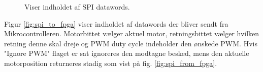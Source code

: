 \begin{figure}[h!]
\centering
{}
\qquad
{}
\caption[Indholdet af SPI datawords]{Viser indholdet af SPI datawords. }
\label{fig:protokol1}
\end{figure}


Figur \ref{fig:spi_to_fpga} viser indholdet af datawords der bliver sendt fra Mikrocontrolleren. 
Motorbittet vælger aktuel motor, retningsbittet vælger hvilken retning denne skal dreje og PWM duty cycle indeholder den ønskede PWM. 
Hvis "Ignore PWM" flaget er sat ignoreres den modtagne besked, mens den aktuelle motorposition returneres stadig som vist på fig.  \ref{fig:spi_from_fpga}. 

